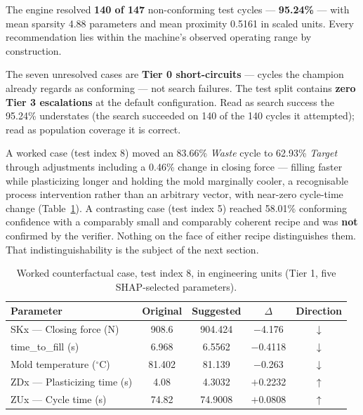 \documentclass[11pt,a4paper]{article}
\begin{document}
The engine resolved \textbf{140 of 147} non-conforming test cycles --- \textbf{95.24\%} --- with mean sparsity 4.88 parameters and mean proximity 0.5161 in scaled units. Every recommendation lies within the machine's observed operating range by construction.

The seven unresolved cases are \textbf{Tier 0 short-circuits} --- cycles the champion already regards as conforming --- not search failures. The test split contains \textbf{zero Tier 3 escalations} at the default configuration. Read as search success the 95.24\% understates (the search succeeded on 140 of the 140 cycles it attempted); read as population coverage it is correct.

A worked case (test index 8) moved an 83.66\% \emph{Waste} cycle to 62.93\% \emph{Target} through adjustments including a 0.46\% change in closing force --- filling faster while plasticizing longer and holding the mold marginally cooler, a recognisable process intervention rather than an arbitrary vector, with near-zero cycle-time change (Table~\ref{tab:worked}). A contrasting case (test index 5) reached 58.01\% conforming confidence with a comparably small and comparably coherent recipe and was \textbf{not} confirmed by the verifier. Nothing on the face of either recipe distinguishes them. That indistinguishability is the subject of the next section.

\begin{table}[htbp]
\centering
\caption{Worked counterfactual case, test index 8, in engineering units (Tier 1, five SHAP-selected parameters).}
\label{tab:worked}
\small
\begin{tabular}{@{}lcccc@{}}
\toprule
\textbf{Parameter} & \textbf{Original} & \textbf{Suggested} & \textbf{$\Delta$} & \textbf{Direction} \\
\midrule
SKx --- Closing force (N)         & 908.6  & 904.424 & $-$4.176  & $\downarrow$ \\
time\_to\_fill (s)                 & 6.968  & 6.5562  & $-$0.4118 & $\downarrow$ \\
Mold temperature ($^\circ$C)      & 81.402 & 81.139  & $-$0.263  & $\downarrow$ \\
ZDx --- Plasticizing time (s)      & 4.08   & 4.3032  & $+$0.2232 & $\uparrow$ \\
ZUx --- Cycle time (s)             & 74.82  & 74.9008 & $+$0.0808 & $\uparrow$ \\
\bottomrule
\end{tabular}
\end{table}
\end{document}
